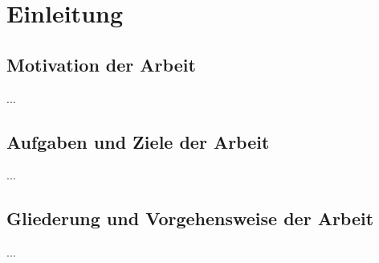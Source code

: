 \chapter{Einleitung}
\section{Motivation der Arbeit}
...

\section{Aufgaben und Ziele der Arbeit}
...
\section{Gliederung und Vorgehensweise der Arbeit}
...